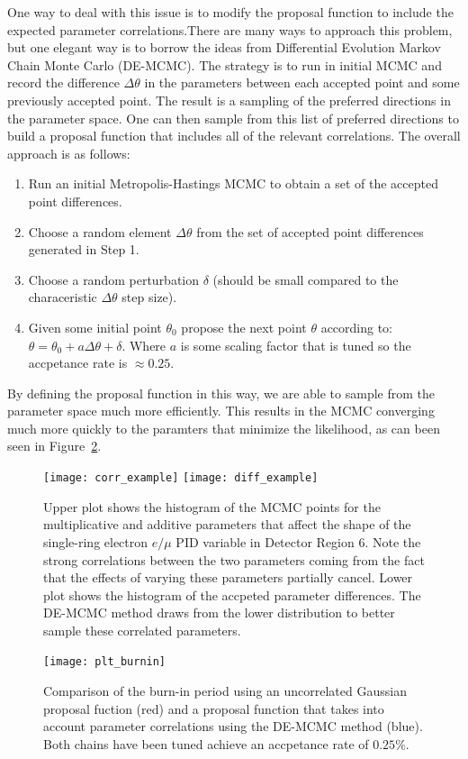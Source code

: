 One way to deal with this issue is to modify the proposal function to include
the expected parameter correlations.There are many ways to approach this
problem, but one elegant way is to borrow the ideas from Differential Evolution
Markov Chain Monte Carlo (DE-MCMC).  The strategy is to run in initial MCMC and
record the difference $\Delta \theta$ in the parameters between each accepted
point and some previously accepted point. The result is a sampling of the
preferred directions in the parameter space. One can then sample from this 
list of preferred directions to build a proposal function that includes all
of the relevant correlations.  The overall approach is as follows:
%
\begin{enumerate}
  \item Run an initial Metropolis-Hastings MCMC to obtain a set of the
    accepted point differences.  
  \item Choose a random element $\Delta \theta$ from the set of accepted point
    differences generated in Step 1.
  \item Choose a random perturbation $\delta$ (should be small compared to the characeristic
    $\Delta \theta$ step size).
  \item Given some initial point $\theta_{0}$ propose the next point $\theta$
    according to: $\theta = \theta_{0} + a \Delta \theta + \delta$. Where $a$ is some scaling factor that is
    tuned so the accpetance rate is $\approx 0.25$.
\end{enumerate}
%
By defining the proposal function in this way, we are able to sample from the
parameter space much more efficiently. This results in the MCMC converging much
more quickly to the paramters that minimize the likelihood, as can been seen in
Figure~\ref{fig:burnin}.


\begin{figure}[h]
  \begin{center}
    \texttt{[image: corr\_example]}
    \texttt{[image: diff\_example]}
  \end{center}
  \caption{Upper plot shows the histogram of the MCMC points for the
  multiplicative and additive parameters that affect the shape of the
  single-ring electron $e/\mu$ PID variable in Detector Region 6.  Note
  the strong correlations between the two parameters coming from the fact that
  the effects of varying these parameters partially cancel.  Lower plot shows
  the histogram of the accpeted parameter differences.  The DE-MCMC method
  draws from the lower distribution to better sample these correlated parameters.}
  \label{fig:parcor}
\end{figure}


\begin{figure}[h]
\begin{center}
\texttt{[image: plt\_burnin]}
\end{center}
\caption{Comparison of the burn-in period using an uncorrelated Gaussian
proposal fuction (red) and a proposal function that takes into account
parameter correlations using the DE-MCMC method (blue).  Both chains have been
tuned achieve an accpetance rate of $0.25\%$.}
\label{fig:burnin}
\end{figure}






